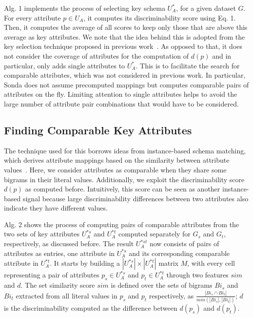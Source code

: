 Alg. 1 implements the process of selecting key schema $U^*_A$, for a given dataset $G$. For every attribute $p \in U_A$, it computes its discriminability score using Eq. 1. Then, it computes the average of all scores to keep only those that are above this average as key attributes. We note that the idea behind this is adopted from the key selection technique proposed in previous work~\cite{DBLP:conf/semweb/SongH11}. As opposed to that, it does not consider the coverage of attributes for the computation of $d(p)$ and in particular, only  
adds single attributes to $U^*_A$. This is to facilitate the search for comparable attributes, which was not considered in previous work. In particular, Sonda does not assume precomputed mappings but computes comparable pairs of attributes on the fly. Limiting attention to single attributes helps to avoid the large number of attribute pair combinations that would have to be considered.  

\subsection{Finding Comparable Key Attributes}
The technique used for this borrows ideas from instance-based schema matching, which derives attribute mappings based on the similarity between attribute values~\cite{DBLP:conf/fskd/FengHQ09,DBLP:conf/iceis/LemeCBF09}. Here, we consider attributes as comparable when they share some bigrams in their literal values. Additionally, we exploit the discriminability score $d(p)$ as computed before. Intuitively, this score can be seen as another instance-based signal because large discriminability differences between two attributes also indicate they have different values. 

Alg. 2 shows the process of computing pairs of comparable attributes from the two sets of key attributes $U^{*s}_A$ and $U^{*t}_A$ computed separately for $G_s$ and $G_t$, respectively, as discussed before. The result $U^{*st}_A$ now consists of pairs of attributes as entries, one attribute in $U^{*s}_A$ and its corresponding comparable attribute in $U^{*t}_A$. It starts by building a $|U^{*s}_A|\times|U^{*t}_A|$ matrix $M$, with every cell representing a pair of attributes $p_s \in U^{*s}_A$ and $p_t \in U^{*t}_A$ through two features $sim$ and $d$. The set similarity score $sim$ is defined over the sets of bigrams $Bi_{s}$ and $Bi_{t}$ extracted from all literal values in $p_s$ and $p_t$ respectively, as $\frac{|Bi_{s} \cap Bi_{t}|}{min(|Bi_{s}|,|Bi_{t}|)}$; $d$ is the discriminability computed as the difference between $d(p_s)$ and $d(p_t)$. 

